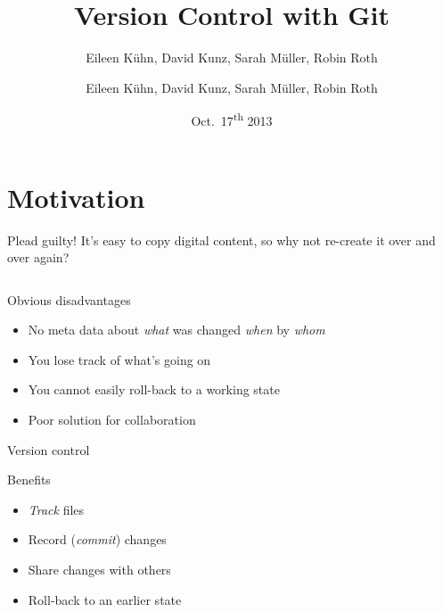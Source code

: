 \documentclass[18pt,mathserif]{beamer}
\title{Version Control with Git}
\author{Eileen K\"uhn, David Kunz, Sarah M\"uller, Robin Roth}
\subtitle{Eileen K\"uhn, David Kunz, Sarah M\"uller, Robin Roth}
\institute{KSETA Doktorandenworkshop, 22.07.2014}
\date{Oct.~17\textsuperscript{th} 2013}
\begin{document}
\maketitle

\section{Motivation}

\begin{frame}{Plead guilty!}
  It's easy to copy digital content, so why not re-create it over and over
  again?

  \begin{columns}[onlytextwidth]

  \end{columns}
\end{frame}
\begin{frame}{Obvious disadvantages}
  \begin{itemize}
    \item No meta data about \emph{what} was changed \emph{when} by
      \emph{whom}
    \item You lose track of what's going on
    \item You cannot easily roll-back to a working state
    \item Poor solution for collaboration
  \end{itemize}
\end{frame}
\begin{frame}{Version control}
  \begin{block}{Benefits}
    \begin{itemize}
      \item \emph{Track} files
      \item Record (\emph{commit}) changes
      \item Share changes with others
      \item Roll-back to an earlier state
    \end{itemize}
  \end{block}
\end{frame}
\end{document}
